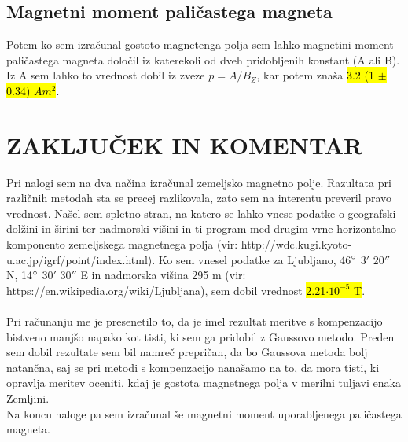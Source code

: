 \documentclass[12pt,a4paper]{article}
\begin{document}
\vspace{0.5cm}

\subsection{Magnetni moment pali\v castega magneta}

Potem ko sem izra\v cunal gostoto magnetenga polja sem lahko magnetini moment pali\v castega magneta dolo\v cil iz katerekoli od dveh pridobljenih konstant (A ali B). Iz A sem lahko to vrednost dobil iz zveze $p = A / B_Z$, kar potem zna\v sa \hl{3.2 (1 $\pm$ 0.34) $A m^2$}.

\newpage

\section{ZAKLJU\v CEK IN KOMENTAR}

Pri nalogi sem na dva na\v cina izra\v cunal zemeljsko magnetno polje. Razultata pri razli\v cnih metodah sta se precej razlikovala, zato sem na interentu preveril pravo vrednost. Na\v sel sem spletno stran, na katero se lahko vnese podatke o geografski dol\v zini in \v sirini ter nadmorski vi\v sini in ti program med drugim vrne horizontalno komponento zemeljskega magnetnega polja (vir: http://wdc.kugi.kyoto-u.ac.jp/igrf/point/index.html). Ko sem vnesel podatke za Ljubljano, 46$\degree$ 3$'$ 20$''$ N, 14$\degree$ 30$'$ 30$''$ E in nadmorska vi\v sina 295 m (vir: https://en.wikipedia.org/wiki/Ljubljana), sem dobil vrednost \hl{2.21$\cdot 10^{-5}$ T}.
\\
\\
Pri ra\v cunanju me je presenetilo to, da je imel rezultat meritve s kompenzacijo bistveno manj\v so napako kot tisti, ki sem ga pridobil z Gaussovo metodo. Preden sem dobil rezultate sem bil namre\v c prepri\v can, da bo Gaussova metoda bolj natan\v cna, saj se pri metodi s kompenzacijo nana\v samo na to, da mora tisti, ki opravlja meritev oceniti, kdaj je gostota magnetnega polja v merilni tuljavi enaka Zemljini.
\\
Na koncu naloge pa sem izra\v cunal \v se magnetni moment uporabljenega pali\v castega magneta. 
\end{document}
